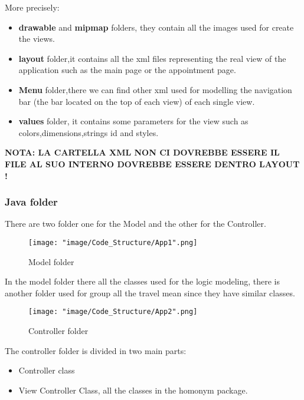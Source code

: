 More precisely:

\begin{itemize}

\item \textbf{drawable} and \textbf{mipmap} folders, they contain all the images used for create the views.

\item \textbf{layout} folder,it contains all the xml files representing the real view of the application such as the main page or the appointment page.

\item \textbf{Menu }folder,there we can find other xml used for modelling the navigation bar (the bar located on the top of each view) of each single view.

\item \textbf{values} folder, it contains some parameters for the view such as colors,dimensions,strings id and styles.  

\end{itemize}

\textbf{NOTA: LA CARTELLA XML NON CI DOVREBBE ESSERE IL FILE AL SUO INTERNO DOVREBBE ESSERE DENTRO LAYOUT !}

\subsubsection{Java folder}

There are two folder one for the Model and the other for the Controller.

\begin{figure}[H]
\begin{center}
\texttt{[image: "image/Code\_Structure/App1".png]}
\caption{Model folder}
\end{center}
\end{figure}

In the model folder there all the classes used for the logic modeling, there is another folder used for group all the travel mean since they have similar classes.

\begin{figure}[H]
\begin{center}
\texttt{[image: "image/Code\_Structure/App2".png]}
\caption{Controller folder}
\end{center}
\end{figure}

The controller folder is divided in two main parts:
\begin{itemize}
\item Controller class
\item View Controller Class, all the classes in the homonym package.
\end{itemize}

